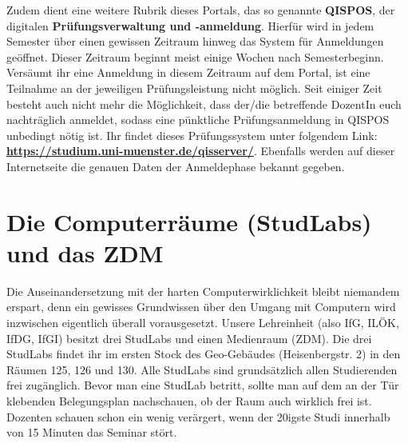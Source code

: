Zudem dient eine weitere Rubrik dieses Portals, das so genannte \textbf{QISPOS}, der digitalen \textbf{Prüfungsverwaltung und -anmeldung}. Hierfür wird in jedem Semester über einen gewissen Zeitraum hinweg das System für Anmeldungen geöffnet. Dieser Zeitraum beginnt meist einige Wochen nach Semesterbeginn. Versäumt ihr eine Anmeldung in diesem Zeitraum auf dem Portal, ist eine Teilnahme an der jeweiligen Prüfungsleistung nicht möglich. Seit einiger Zeit besteht auch nicht mehr die Möglichkeit, dass der/die betreffende DozentIn euch nachträglich anmeldet, sodass eine pünktliche Prüfungsanmeldung in QISPOS unbedingt nötig ist. Ihr ﬁndet dieses Prüfungssystem unter folgendem Link: \textbf{\url{https://studium.uni-muenster.de/qisserver/}}. Ebenfalls werden auf dieser Internetseite die genauen Daten der Anmeldephase bekannt gegeben.

\section*{Die Computerräume (StudLabs) und das ZDM}
Die Auseinandersetzung mit der harten Computerwirklichkeit bleibt niemandem erspart, denn ein gewisses Grundwissen über den Umgang mit Computern wird inzwischen eigentlich überall vorausgesetzt. Unsere Lehreinheit (also IfG, ILÖK, IfDG, IfGI) besitzt drei StudLabs und einen Medienraum (ZDM). Die drei StudLabs findet ihr im ersten Stock des Geo-Gebäudes (Heisenbergstr. 2) in den Räumen 125, 126 und 130. Alle StudLabs sind grundsätzlich allen Studierenden frei zugänglich. Bevor man eine StudLab betritt, sollte man auf dem an der Tür klebenden Belegungsplan nachschauen, ob der Raum auch wirklich frei ist. Dozenten schauen schon ein wenig verärgert, wenn der 20igste Studi innerhalb von 15 Minuten das Seminar stört.

